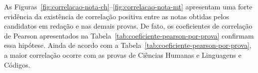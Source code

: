 \documentclass[12pt]{article}
\newcommand{\reffig}[1]{Fig.~\ref{fig:#1}}
\newcommand{\reftab}[1]{Tabela~\ref{tab:#1}}
\begin{document}


As Figuras~\ref{fig:correlacao-nota-ch}--\ref{fig:correlacao-nota-mt} apresentam uma forte evidência da existência de correlação positiva entre as notas obtidas pelos candidatos em redação e nas demais provas.
De fato, os coeficientes de correlação de Pearson apresentados na \reftab{coeficiente-pearson-por-prova} confirmam essa hipótese.
Ainda de acordo com a \reftab{coeficiente-pearson-por-prova}, a maior correlação ocorre com as provas de Ciências Humanas e Linguagens e Códigos.
\end{document}

